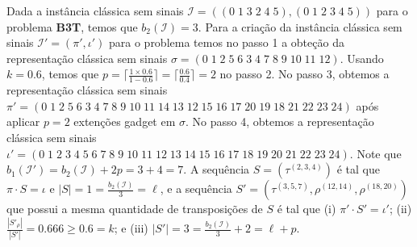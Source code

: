 \begin{example}\label{example:QBULCCOI}
  Dada a instância clássica sem sinais $\mathcal{I} = ((0 \;1 \; 3 \; 2 \; 4 \; 5),(0 \; 1 \; 2 \; 3 \; 4 \; 5))$ para o problema \textbf{B3T}, temos que $b_2(\mathcal{I}) = 3$. Para a criação da instância clássica sem sinais $\mathcal{I'}=(\pi',\iota')$ para o problema \SbPRT{} temos no passo 1 a obteção da representação clássica sem sinais $\sigma = ({0} \; {1} \; {2} \; {5} \; {6} \; {3} \; {4} \; {7} \; {8} \; {9} \; {10} \; {11} \; {12})$. Usando $k = 0.6$, temos que $p = \lceil\frac{1\times 0.6}{1 - 0.6}\rceil = \lceil\frac{0.6}{0.4}\rceil = 2$ no passo 2. No passo 3, obtemos a representação clássica sem sinais $\pi' = ({0} \; {1} \; {2} \; {5} \; {6} \; {3} \; {4} \; {7} \; {8} \; {9} \; {10} \; {11} \; {14} \; {13} \; {12} \; {15} \; {16} \; {17} \; {20} \; {19} \; {18} \; {21} \; {22} \; {23} \;{24})$ após aplicar $p = 2$ extenções gadget em $\sigma$. No passo 4, obtemos a representação clássica sem sinais $\iota' = ({0} \; {1} \; {2} \; {3} \; {4} \; {5} \; {6} \; {7} \; {8} \; {9} \; {10} \; {11} \; {12} \; {13} \; {14} \; {15} \; {16} \; {17} \; {18} \; {19} \; {20} \; {21} \; {22} \; {23} \; {24})$. Note que $b_1(\mathcal{I'}) = b_2(\mathcal{I}) + 2p = 3 + 4 = 7$. A sequência $S = (\tau^{(2,3,4)})$ é tal que $\pi \cdot S = \iota$ e $|S| = 1 = \frac{b_2(\mathcal{I})}{3} = \ell$, e a sequência $S' = (\tau^{(3,5,7)},\rho^{(12,14)},\rho^{(18,20)})$ que possui a mesma quantidade de transposições de $S$ é tal que (i) $\pi' \cdot S' = \iota'$; (ii) $\frac{|S'_\rho|}{|S'|} = 0.666 \ge 0.6 = k$; e (iii) $|S'| = 3 = \frac{b_2(\mathcal{I})}{3} + 2 = \ell+p$.
\end{example}
